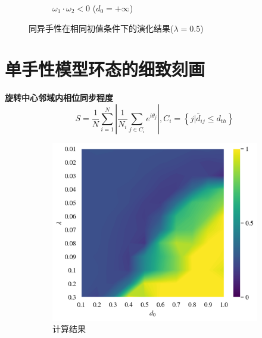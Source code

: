 \documentclass{article}
\begin{document}
\begin{figure}[H]
\begin{subfigure}[b]{0.49\textwidth}
		\vspace{-1cm}
		\caption{$\omega_1 \cdot \omega_2 < 0$ ($d_0=+\infty$)}
	\end{subfigure}
	\caption{同异手性在相同初值条件下的演化结果($\lambda=0.5$)}
	\label{fig:fig2.6.chir}
\end{figure}

\newpage
\section{单手性模型环态的细致刻画}

\noindent\textbf{旋转中心邻域内相位同步程度}
$$
S=\frac{1}{N}\sum_{i=1}^N{\left| \frac{1}{N_i}\sum_{j\in C_i}{e^{i\theta _j}} \right|}, C_i=\left\{ j|\bar{d}_{ij}\le d_{th} \right\} 
$$
\vspace{-0.5cm}
\begin{figure}[H]
	\centering
	\begin{subfigure}[b]{0.49\textwidth}
		\includegraphics[width=\textwidth]{./figs/limitDisPhaseSyncRing.png}
		\vspace{-1cm}
		\caption{计算结果}
	\end{subfigure}
	\begin{subfigure}[b]{0.49\textwidth}

\end{subfigure}
\end{figure}
\end{document}
